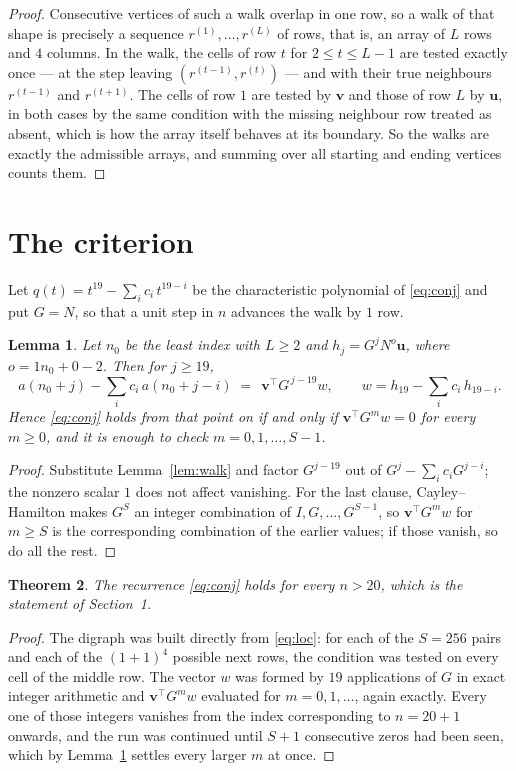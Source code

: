 \documentclass[11pt,a4paper]{article}
\theoremstyle{plain}
\newtheorem{theorem}{Theorem}
\newtheorem{lemma}[theorem]{Lemma}
\theoremstyle{definition}
\begin{document}
\begin{proof}
Consecutive vertices of such a walk overlap in one row, so a walk of that shape is
precisely a sequence $r^{(1)},\dots,r^{(L)}$ of rows, that is, an array of $L$ rows
and $4$ columns. In the walk, the cells of row $t$ for $2\le t\le L-1$ are tested
exactly once --- at the step leaving $(r^{(t-1)},r^{(t)})$ --- and with their true
neighbours $r^{(t-1)}$ and $r^{(t+1)}$. The cells of row $1$ are tested by
$\mathbf{v}$ and those of row $L$ by $\mathbf{u}$, in both cases by the same condition
with the missing neighbour row treated as absent, which is how the array itself behaves at
its boundary. So the walks are exactly the admissible arrays, and summing over all starting
and ending vertices counts them.
\end{proof}

\section{The criterion}

Let $q(t)=t^{19}-\sum_i c_i\,t^{19-i}$ be the characteristic polynomial of
\eqref{eq:conj} and put $G=N$, so that a unit step in $n$ advances the walk by
$1$ row.

\begin{lemma}\label{lem:crit}
Let $n_0$ be the least index with $L\ge2$ and $h_j=G^{j}N^{o}\mathbf{u}$, where
$o=1n_0+0-2$. Then for $j\ge19$,
\[
a(n_0+j)-\sum_i c_i\,a(n_0+j-i)\;=\;\,\mathbf{v}^{\!\top}G^{\,j-19}w,
\qquad w=h_{19}-\sum_i c_i\,h_{19-i} .
\]
Hence \eqref{eq:conj} holds from that point on if and only if
$\mathbf{v}^{\!\top}G^{m}w=0$ for every $m\ge0$, and it is enough to check
$m=0,1,\dots,S-1$.
\end{lemma}

\begin{proof}
Substitute Lemma~\ref{lem:walk} and factor $G^{j-19}$ out of
$G^{j}-\sum_ic_iG^{j-i}$; the nonzero scalar $1$ does not affect
vanishing. For the last clause, Cayley--Hamilton makes $G^{S}$ an integer combination of
$I,G,\dots,G^{S-1}$, so $\mathbf{v}^{\!\top}G^{m}w$ for $m\ge S$ is the corresponding
combination of the earlier values; if those vanish, so do all the rest.
\end{proof}

\begin{theorem}
The recurrence \eqref{eq:conj} holds for every $n>20$, which is the statement of
Section~1.
\end{theorem}

\begin{proof}
The digraph was built directly from \eqref{eq:loc}: for each of the $S=256$ pairs and each
of the $(1+1)^{4}$ possible next rows, the condition was tested on every cell of
the middle row. The vector $w$ was formed by $19$ applications of $G$ in exact integer
arithmetic and $\mathbf{v}^{\!\top}G^{m}w$ evaluated for $m=0,1,\dots$, again exactly.
Every one of those integers vanishes from the index corresponding to $n=20+1$ onwards,
and the run was continued until $S+1$ consecutive zeros had been seen, which by
Lemma~\ref{lem:crit} settles every larger $m$ at once.
\end{proof}
\end{document}
